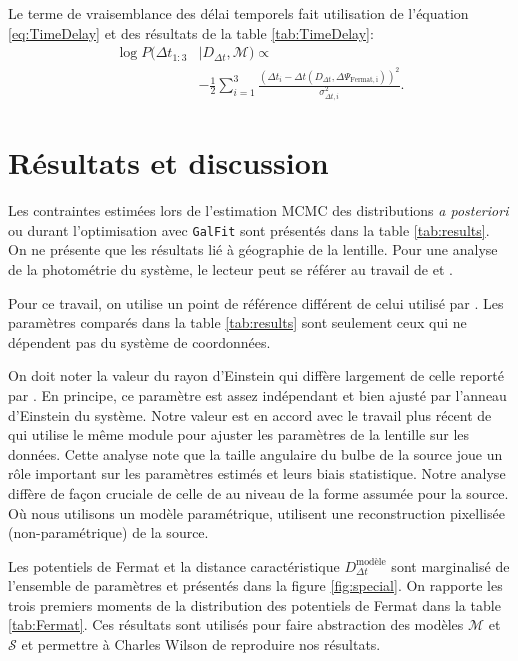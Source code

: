 \documentclass[times,10pt,twocolumn]{article}
\begin{document}
Le terme de vraisemblance des délai temporels fait utilisation de 
l'équation \eqref{eq:TimeDelay} et des résultats de la table 
\ref{tab:TimeDelay}:
\begin{align}
        \nonumber
        \log P(\Delta t_{1:3}&| D_{\Delta t}, \mathcal{M}) \propto  \\
        \label{eq:TimeDelayLike}
                       &-\frac{1}{2} \sum_{i=1}^{3} \frac{(\Delta t_i - 
        \Delta t(D_{\Delta t}, \Delta\Psi_{\mathrm{Fermat, i}}))^{2}}{\sigma_{\Delta t, i}^{2}}.
\end{align}

\section{Résultats et discussion}\label{sec:resultats}
Les contraintes estimées lors de l'estimation MCMC des distributions 
\textit{a posteriori} ou durant l'optimisation avec \texttt{GalFit} 
sont présentés dans la table \ref{tab:results}. On ne présente que 
les résultats lié à géographie de la lentille. Pour une 
analyse de la photométrie du système, le lecteur peut se référer au 
travail de \citet{Suyu2013} et \citet{Tewes2013}.

Pour ce travail, on utilise un point de référence différent de celui utilisé 
par \citet{Suyu2013}. Les paramètres comparés dans la table \ref{tab:results} 
sont seulement ceux qui ne dépendent pas du système de coordonnées.

On doit noter la valeur du rayon d'Einstein qui diffère largement de celle 
reporté par \citet{Suyu2013}. En principe, ce paramètre est assez indépendant 
et bien ajusté par l'anneau d'Einstein du système. Notre valeur est en accord 
avec le travail plus récent de \citet{Birrer2016} qui utilise le même 
module pour ajuster les paramètres de la lentille sur les données. Cette analyse 
note que la taille angulaire du bulbe de la source joue un rôle important sur les 
paramètres estimés et leurs biais statistique. Notre analyse diffère de façon cruciale 
de celle 
de \citet{Suyu2013} au niveau de la forme assumée pour la source. Où nous utilisons 
un modèle paramétrique, \citet{Suyu2013} utilisent une reconstruction pixellisée 
(non-paramétrique) de la source. 

Les potentiels de Fermat et la distance caractéristique $D^{\text{modèle}}_{\Delta t}$ sont 
marginalisé de l'ensemble de paramètres et présentés dans la figure 
\ref{fig:special}. On rapporte les trois premiers moments de la distribution 
des potentiels de Fermat dans la table \ref{tab:Fermat}. Ces résultats 
sont utilisés pour faire abstraction des modèles $\mathcal{M}$ et $\mathcal{S}$ 
et permettre à Charles Wilson de reproduire nos résultats.
\end{document}
